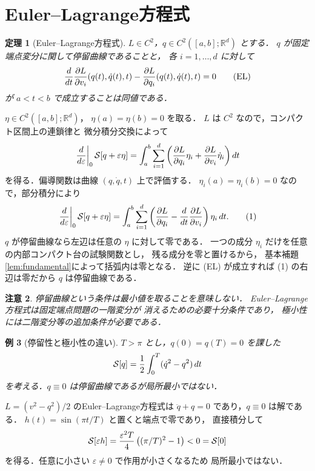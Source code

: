 \documentclass[a5paper,10pt,onecolumn]{jsarticle}
\makeatletter
\theoremstyle{mathnotetheorem}
\newtheorem{theorem}{定理}[section]
\newtheorem{example}[theorem]{例}
\newtheorem{remark}[theorem]{注意}
\renewcommand{\proofname}{証明}
\renewenvironment{proof}[1][\proofname]{%
  \par\pushQED{\qed}\normalfont\topsep4\p@\@plus2\p@\relax
  \trivlist\item[\hskip\labelsep\bfseries #1]\ignorespaces
}{\popQED\endtrivlist\@endpefalse}
\makeatother
\begin{document}
\section{Euler--Lagrange方程式}
\begin{theorem}[Euler--Lagrange方程式]\label{thm:el}
$L\in C^2$，$q\in C^2([a,b];\mathbb R^d)$ とする．
$q$ が固定端点変分に関して停留曲線であることと，
各 $i=1,\ldots,d$ に対して
\[
 {d\over dt}{\partial L\over\partial v_i}
 (q(t),\dot q(t),t)
 -{\partial L\over\partial q_i}
 (q(t),\dot q(t),t)=0
 \tag{EL}
\]
が $a<t<b$ で成立することは同値である．
\end{theorem}
\begin{proof}
$\eta\in C^2([a,b];\mathbb R^d)$，
$\eta(a)=\eta(b)=0$ を取る．
$L$ は $C^2$ なので，コンパクト区間上の連鎖律と
微分積分交換によって
\[
 \left.{d\over d\varepsilon}\right|_0\mathcal S[q+\varepsilon\eta]
 =\int_a^b
 \sum_{i=1}^d
 \left(
 {\partial L\over\partial q_i}\eta_i+
 {\partial L\over\partial v_i}\dot\eta_i
 \right)dt
\]
を得る．偏導関数は曲線 $(q,\dot q,t)$ 上で評価する．
$\eta_i(a)=\eta_i(b)=0$ なので，部分積分により
\[
 \left.{d\over d\varepsilon}\right|_0\mathcal S[q+\varepsilon\eta]
 =\int_a^b\sum_{i=1}^d
 \left({\partial L\over\partial q_i}
 -{d\over dt}{\partial L\over\partial v_i}\right)\eta_i\,dt.
 \tag{1}
\]
$q$ が停留曲線なら左辺は任意の $\eta$ に対して零である．
一つの成分 $\eta_i$ だけを任意の内部コンパクト台の試験関数とし，
残る成分を零と置けるから，
基本補題\ref{lem:fundamental}によって括弧内は零となる．
逆に (EL) が成立すれば (1) の右辺は零だから
$q$ は停留曲線である．
\end{proof}
\begin{remark}
停留曲線という条件は最小値を取ることを意味しない．
Euler--Lagrange方程式は固定端点問題の一階変分が
消えるための必要十分条件であり，
極小性には二階変分等の追加条件が必要である．
\end{remark}
\begin{example}[停留性と極小性の違い]\label{ex:nonminimum}
$T>\pi$ とし，$q(0)=q(T)=0$ を課した
\[
 \mathcal S[q]={1\over2}\int_0^T(\dot q^2-q^2)\,dt
\]
を考える．$q\equiv0$ は停留曲線であるが局所最小ではない．
\end{example}
\begin{proof}
$L=(v^2-q^2)/2$ のEuler--Lagrange方程式は
$\ddot q+q=0$ であり，$q\equiv0$ は解である．
$h(t)=\sin(\pi t/T)$ と置くと端点で零であり，
直接積分して
\[
 \mathcal S[\varepsilon h]
 ={\varepsilon^2T\over4}
 \left((\pi/T)^2-1\right)<0=\mathcal S[0]
\]
を得る．任意に小さい $\varepsilon\ne0$ で作用が小さくなるため
局所最小ではない．
\end{proof}
\end{document}
